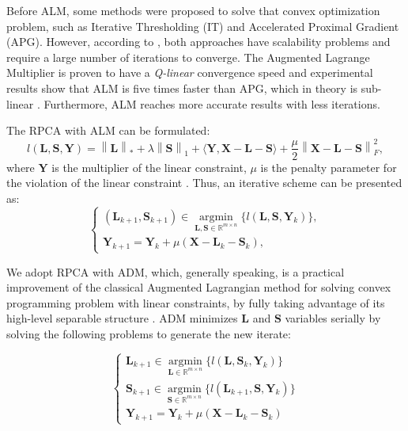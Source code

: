 \documentclass[review]{elsarticle}
\begin{document}
Before ALM, some methods were proposed to solve that convex optimization problem, such as Iterative Thresholding (IT) and Accelerated Proximal Gradient (APG). However, according to \cite{lin2010augmented}, both approaches have scalability problems and require a large number of iterations to converge. The Augmented Lagrange Multiplier is proven to have a \emph{Q-linear} convergence speed and experimental results show that ALM is five times faster than APG, which in theory is sub-linear \cite{lin2010augmented}. Furthermore, ALM reaches more accurate results with less iterations.

The RPCA with ALM can be formulated:
\begin{equation}\label{eq:eq04}
	l(\boldsymbol{L}, \boldsymbol{S}, \boldsymbol{Y}) = \left\|\boldsymbol{L}\right\|_* + \lambda\left\|\boldsymbol{S}\right\|_1 + \langle \boldsymbol{Y, X - L - S}  \rangle + \frac{\mu}{2}\left\|\boldsymbol{X - L - S}\right\|_F^2,
\end{equation}
where $\boldsymbol{Y}$ is the multiplier of the linear constraint, $\mu$ is the penalty parameter for the violation of the linear constraint \cite{yuan2009sparse}. Thus, an iterative scheme can be presented as:
\begin{equation}\label{eq:eq05}
	\left\{
		\begin{matrix} 
			(\boldsymbol{L}_{k+1}, \boldsymbol{S}_{k+1}) \in \operatorname*{argmin}_{\boldsymbol{L,S} \in \mathbb{R}^{m \times n}} \{l(\boldsymbol{L}, \boldsymbol{S}, \boldsymbol{Y}_{k})\}, \\ 
			\boldsymbol{Y}_{k+1} = \boldsymbol{Y}_{k} + \mu(\boldsymbol{X} - \boldsymbol{L}_{k} - \boldsymbol{S}_{k}),
		\end{matrix}
	\right.
\end{equation}

We adopt RPCA with ADM, which, generally speaking, is a practical improvement of the classical Augmented Lagrangian method for solving convex programming problem with linear constraints, by fully taking advantage of its high-level separable structure \cite{yuan2009sparse}. ADM minimizes $\boldsymbol{L}$ and $\boldsymbol{S}$ variables serially by solving the following problems to generate the new iterate:

\begin{equation}\label{eq:eq06}
	\left\{\begin{matrix}
	\boldsymbol{L}_{k+1} \in \operatorname*{argmin}_{\boldsymbol{L} \in \mathbb{R}^{m \times n}}\{l(\boldsymbol{L}, \boldsymbol{S}_{k}, \boldsymbol{Y}_{k})\}\\ 
	\boldsymbol{S}_{k+1} \in \operatorname*{argmin}_{\boldsymbol{S} \in \mathbb{R}^{m \times n}}\{l(\boldsymbol{L}_{k+1}, \boldsymbol{S}, \boldsymbol{Y}_{k})\}\\ 
	\boldsymbol{Y}_{k+1} = \boldsymbol{Y}_{k} + \mu(\boldsymbol{X} - \boldsymbol{L}_{k} - \boldsymbol{S}_{k})
	\end{matrix}\right.
\end{equation}
\end{document}
